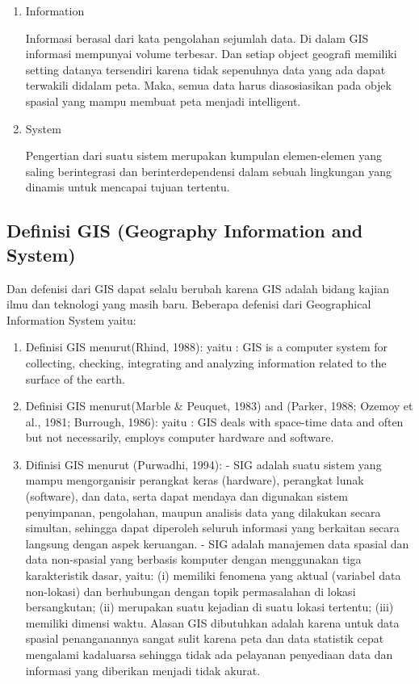 \begin{enumerate}
\item Information

Informasi berasal dari kata pengolahan sejumlah data. Di dalam GIS informasi mempunyai
volume terbesar. Dan setiap object geografi memiliki setting datanya tersendiri karena 
tidak sepenuhnya data yang ada dapat terwakili didalam peta. Maka, semua data harus
diasosiasikan pada objek spasial yang mampu membuat peta menjadi intelligent.

\item System

Pengertian dari suatu sistem merupakan kumpulan elemen-elemen yang saling berintegrasi 
dan berinterdependensi dalam sebuah lingkungan yang dinamis untuk mencapai tujuan tertentu.
\end{enumerate}

\subsection{Definisi GIS (Geography Information and System)}
Dan defenisi dari GIS dapat selalu berubah karena GIS adalah bidang kajian ilmu 
dan teknologi yang masih baru. Beberapa defenisi dari Geographical Information System yaitu:
\begin{enumerate}
\item Definisi GIS menurut(Rhind, 1988):
yaitu : GIS is a computer system for collecting, checking, integrating and analyzing
information related to the surface of the earth.

\item Definisi GIS menurut(Marble \& Peuquet, 1983) and (Parker,
1988; Ozemoy et al., 1981; Burrough, 1986):
yaitu : GIS deals with space-time data and often but not necessarily, employs computer
hardware and software.

\item Difinisi GIS menurut (Purwadhi, 1994):
- SIG adalah suatu sistem yang mampu mengorganisir perangkat keras (hardware),
perangkat lunak (software), dan data, serta dapat mendaya dan digunakan sistem
penyimpanan, pengolahan, maupun analisis data yang dilakukan secara simultan, sehingga dapat
diperoleh seluruh informasi yang berkaitan secara langsung dengan aspek keruangan.
- SIG adalah manajemen data spasial dan data non-spasial yang berbasis komputer
dengan menggunakan tiga karakteristik dasar, yaitu: 
(i) memiliki fenomena yang aktual (variabel data non-lokasi) dan berhubungan 
dengan topik permasalahan di lokasi bersangkutan; 
(ii) merupakan suatu kejadian di suatu lokasi tertentu; 
(iii) memiliki dimensi waktu. Alasan GIS dibutuhkan adalah karena untuk data spasial 
penanganannya sangat sulit karena peta dan data statistik cepat mengalami kadaluarsa 
sehingga tidak ada pelayanan penyediaan data dan informasi yang diberikan menjadi tidak akurat.
\end{enumerate} 

